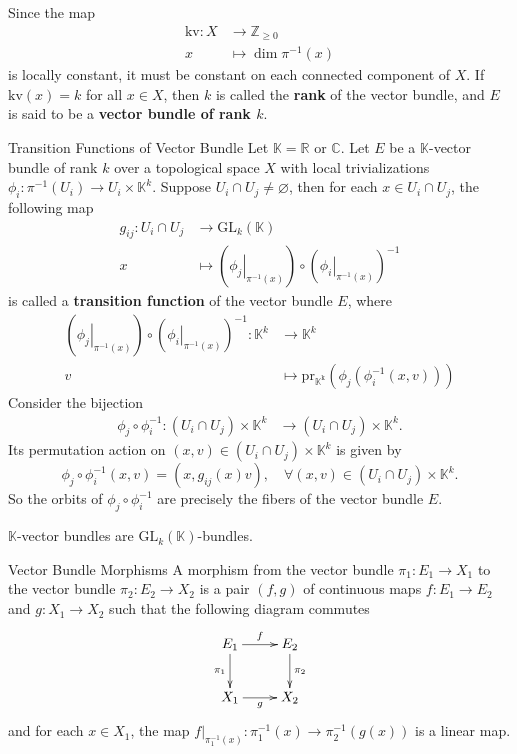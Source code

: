 \documentclass{report}
\begin{document}
Since the map
\[
	\begin{aligned}
		\mathrm{kv}:X & \longrightarrow \mathbb{Z}_{\ge 0} \\
		x             & \longmapsto \dim \pi^{-1}(x)
	\end{aligned}
\]
is locally constant, it must be constant on each connected component of $X$. If $\mathrm{kv}(x)=k$ for all $x\in X$, then $k$ is called the \textbf{rank} of the vector bundle, and $E$ is said to be a \textbf{vector bundle of rank $k$}.

\begin{definition}{Transition Functions of Vector Bundle}{}
	Let $\mathbb{K}=\mathbb{R}\text{ or }\mathbb{C}$. Let $E$ be a $\mathbb{K}$-vector bundle of rank $k$ over a topological space $X$ with local trivializations $\phi_i:\pi^{-1}(U_i)\to U_i\times \mathbb{K}^k$. Suppose $U_i\cap U_j\neq\varnothing$, then for each $x\in U_i\cap U_j$, the following map
	\begin{align*}
		g_{ij}:U_i\cap U_j&\longrightarrow \mathrm{GL}_k(\mathbb{K})\\
		x&\longmapsto \left(\left.\phi_j\right|_{\pi^{-1}(x)}\right)\circ\left(\left.\phi_i\right|_{\pi^{-1}(x)}\right)^{-1} 
	\end{align*}	
	is called a \textbf{transition function} of the vector bundle $E$, where
	\begin{align*}
		\left(\left.\phi_j\right|_{\pi^{-1}(x)}\right)\circ\left(\left.\phi_i\right|_{\pi^{-1}(x)}\right)^{-1} :\mathbb{K}^k&\longrightarrow \mathbb{K}^k\\
		v&\longmapsto \mathrm{pr_{\mathbb{K}^k}}\left(\phi_j\left(\phi_i^{-1}(x,v)\right)\right)
	\end{align*}
	Consider the bijection
	\begin{align*}
		\phi_j\circ\phi_i^{-1}:(U_i\cap U_j)\times \mathbb{K}^k&\longrightarrow (U_i\cap U_j)\times \mathbb{K}^k.
	\end{align*}
	Its permutation action on $(x,v)\in (U_i\cap U_j)\times \mathbb{K}^k$ is given by
	\[
		\phi_j\circ\phi_i^{-1}(x,v)=\left(x,g_{ij}(x)v\right), \quad\forall (x,v)\in (U_i\cap U_j)\times \mathbb{K}^k.
	\]
	So the orbits of $\phi_j\circ\phi_i^{-1}$ are precisely the fibers of the vector bundle $E$.
\end{definition}
$\mathbb{K}$-vector bundles are $\mathrm{GL}_k(\mathbb{K})$-bundles.

\begin{definition}{Vector Bundle Morphisms}{}
	A morphism from the vector bundle $\pi_1: E_1\to X_1$ to the vector bundle $\pi_2: E_2\to X_2$ is a pair $(f,g)$ of continuous maps $f:E_1\to E_2$ and $g:X_1\to X_2$ such that the following diagram commutes
	\[\xymatrix{
			E_1\ar[d]_{\pi_1}\ar[r]^{f}  & E_2\ar[d]^{\pi_2}\\
			X_1\ar[r]_{g}&X_2
		}\]
	and for each $x\in X_1$, the map $\left.f\right|_{\pi_1^{-1}(x)}:\pi_1^{-1}(x)\to \pi_2^{-1}(g(x))$ is a linear map.
\end{definition}
\end{document}
